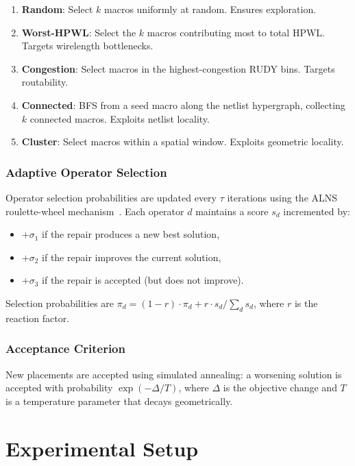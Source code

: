 \documentclass[sigconf,anonymous,review,9pt]{acmart}
\begin{document}
\begin{enumerate}
    \item \textbf{Random}: Select $k$ macros uniformly at random. Ensures exploration.
    \item \textbf{Worst-HPWL}: Select the $k$ macros contributing most to total HPWL. Targets wirelength bottlenecks.
    \item \textbf{Congestion}: Select macros in the highest-congestion RUDY bins. Targets routability.
    \item \textbf{Connected}: BFS from a seed macro along the netlist hypergraph, collecting $k$ connected macros. Exploits netlist locality.
    \item \textbf{Cluster}: Select macros within a spatial window. Exploits geometric locality.
\end{enumerate}

\subsubsection{Adaptive Operator Selection}
Operator selection probabilities are updated every $\tau$ iterations using the ALNS roulette-wheel mechanism~\cite{ropke2006alns}. Each operator $d$ maintains a score $s_d$ incremented by:
\begin{itemize}
    \item $+\sigma_1$ if the repair produces a new best solution,
    \item $+\sigma_2$ if the repair improves the current solution,
    \item $+\sigma_3$ if the repair is accepted (but does not improve).
\end{itemize}
Selection probabilities are $\pi_d = (1 - r) \cdot \pi_d + r \cdot s_d / \sum_d s_d$, where $r$ is the reaction factor.

\subsubsection{Acceptance Criterion}
New placements are accepted using simulated annealing: a worsening solution is accepted with probability $\exp(-\Delta / T)$, where $\Delta$ is the objective change and $T$ is a temperature parameter that decays geometrically.


\section{Experimental Setup}
\label{sec:setup}
\end{document}
